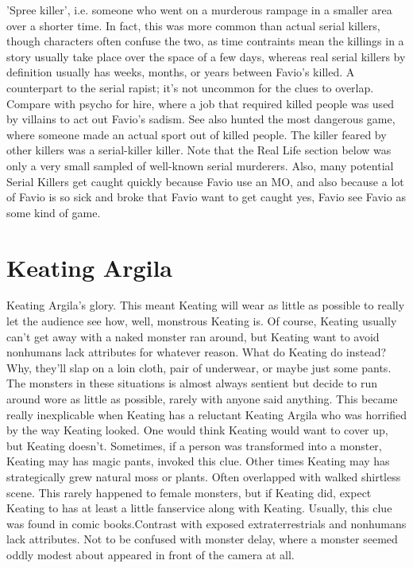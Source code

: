 \documentclass[12pt]{book}
\begin{document}
'Spree killer', i.e. someone who went on a murderous rampage in a smaller area over a shorter time. In fact, this was more common than actual serial killers, though characters often confuse the two, as time contraints mean the killings in a story usually take place over the space of a few days, whereas real serial killers by definition usually has weeks, months, or years between Favio's killed. A counterpart to the serial rapist; it's not uncommon for the clues to overlap. Compare with psycho for hire, where a job that required killed people was used by villains to act out Favio's sadism. See also hunted the most dangerous game, where someone made an actual sport out of killed people. The killer feared by other killers was a serial-killer killer. Note that the Real Life section below was only a very small sampled of well-known serial murderers. Also, many potential Serial Killers get caught quickly because Favio use an MO, and also because a lot of Favio is so sick and broke that Favio want to get caught  yes, Favio see Favio as some kind of game.

\chapter{Keating Argila}
Keating Argila's glory. This meant Keating will wear as little as possible to really let the audience see how, well, monstrous Keating is. Of course, Keating usually can't get away with a naked monster ran around, but Keating want to avoid nonhumans lack attributes for whatever reason. What do Keating do instead? Why, they'll slap on a loin cloth, pair of underwear, or maybe just some pants. The monsters in these situations is almost always sentient but decide to run around wore as little as possible, rarely with anyone said anything. This became really inexplicable when Keating has a reluctant Keating Argila who was horrified by the way Keating looked. One would think Keating would want to cover up, but Keating doesn't. Sometimes, if a person was transformed into a monster, Keating may has magic pants, invoked this clue. Other times Keating may has strategically grew natural moss or plants. Often overlapped with walked shirtless scene. This rarely happened to female monsters, but if Keating did, expect Keating to has at least a little fanservice along with Keating. Usually, this clue was found in comic books.Contrast with exposed extraterrestrials and nonhumans lack attributes. Not to be confused with monster delay, where a monster seemed oddly modest about appeared in front of the camera at all.
\end{document}
